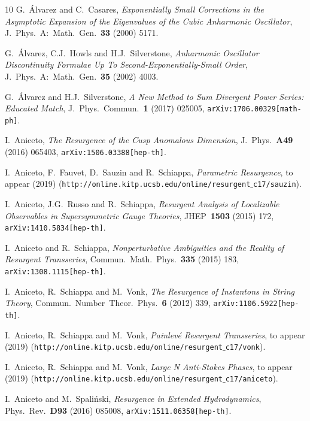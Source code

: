 \documentclass[11pt,a4paper]{article}
\begin{document}
\begin{thebibliography}{10}
G.~\'Alvarez and C.~Casares,
\textit{Exponentially Small Corrections in the Asymptotic Expansion of the Eigenvalues of the Cubic Anharmonic Oscillator},
J.\ Phys.\ A:\ Math.\ Gen.\ \textbf{33} (2000) 5171.

G.~\'Alvarez, C.J.~Howls and H.J.~Silverstone,
\textit{Anharmonic Oscillator Discontinuity Formulae Up To Second-Exponentially-Small Order},
J.\ Phys.\ A:\ Math.\ Gen.\ \textbf{35} (2002) 4003.

G.~\'Alvarez and H.J.~Silverstone,
\textit{A New Method to Sum Divergent Power Series: Educated Match},
J.\ Phys.\ Commun.\ \textbf{1} (2017) 025005,
\texttt{arXiv:1706.00329[math-ph]}.

I.~Aniceto,
\textit{The Resurgence of the Cusp Anomalous Dimension},
J.\ Phys.\ \textbf{A49} (2016) 065403,
\texttt{arXiv:1506.03388[hep-th]}.

I.~Aniceto, F.~Fauvet, D.~Sauzin and R.~Schiappa,
\textit{Parametric Resurgence},
to appear (2019)
(\texttt{http://online.kitp.ucsb.edu/online/resurgent$\_$c17/sauzin}).

I.~Aniceto, J.G.~Russo and R.~Schiappa,
\textit{Resurgent Analysis of Localizable Observables in Supersymmetric Gauge Theories},
JHEP\ \textbf{1503} (2015) 172,
\texttt{arXiv:1410.5834[hep-th]}.

I.~Aniceto and R.~Schiappa,
\textit{Nonperturbative Ambiguities and the Reality of Resurgent Transseries},
Commun.\ Math.\ Phys.\ \textbf{335} (2015) 183,
\texttt{arXiv:1308.1115[hep-th]}.

I.~Aniceto, R.~Schiappa and M.~Vonk,
\textit{The Resurgence of Instantons in String Theory},
Commun.\ Number\ Theor.\ Phys.\ \textbf{6} (2012) 339,
\texttt{arXiv:1106.5922[hep-th]}.

I.~Aniceto, R.~Schiappa and M.~Vonk,
\textit{Painlev\'e Resurgent Transseries},
to appear (2019)
(\texttt{http://online.kitp.ucsb.edu/online/resurgent$\_$c17/vonk}).

I.~Aniceto, R.~Schiappa and M.~Vonk,
\textit{Large N Anti-Stokes Phases},
to appear (2019)
(\texttt{http://online.kitp.ucsb.edu/online/resurgent$\_$c17/aniceto}).

I.~Aniceto and M.~Spali\'nski,
\textit{Resurgence in Extended Hydrodynamics},
Phys.\ Rev.\ \textbf{D93} (2016) 085008,
\texttt{arXiv:1511.06358[hep-th]}.


\end{thebibliography}
\end{document}
